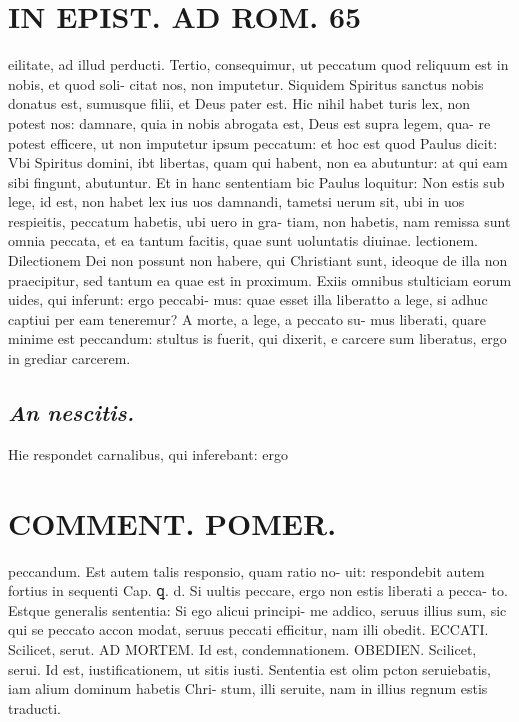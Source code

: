 \documentclass{article}
\begin{document}
\begin{pages}
\section*{IN EPIST. AD ROM.  65 }
\marginpar{[ p.]}\pstart eilitate, ad illud perducti. Tertio, consequimur, ut peccatum quod reliquum est in nobis, et quod soli- citat nos, non imputetur. Siquidem Spiritus sanctus nobis donatus est, sumusque filii, et Deus pater est.  Hic nihil habet turis lex, non potest nos: damnare, quia in nobis abrogata est, Deus est supra legem, qua- re potest efficere, ut non imputetur ipsum peccatum: et hoc est quod Paulus dicit: Vbi Spiritus domini, ibt libertas, quam qui habent, non ea abutuntur: at qui eam sibi fingunt, abutuntur. Et in hanc sententiam bic Paulus loquitur: Non estis sub lege, id est, non habet lex ius uos damnandi, tametsi uerum sit, ubi in uos respieitis, peccatum habetis, ubi uero in gra- tiam, non habetis, nam remissa sunt omnia peccata, et ea tantum facitis, quae sunt uoluntatis diuinae.  lectionem. Dilectionem Dei non possunt non habere, qui Christiant sunt, ideoque de illa non praecipitur, sed tantum ea quae est in proximum. Exiis omnibus stulticiam eorum uides, qui inferunt: ergo peccabi- mus: quae esset illa liberatto a lege, si adhuc captiui per eam teneremur? A morte, a lege, a peccato su- mus liberati, quare minime est peccandum: stultus is fuerit, qui dixerit, e carcere sum liberatus, ergo in grediar carcerem.   \pend
{}
{}
\subsection*{\textit{An nescitis. }}\pstart Hie respondet carnalibus, qui inferebant: ergo  \pend
\section*{COMMENT. POMER.  }\pstart peccandum. Est autem talis responsio, quam ratio no- uit: respondebit autem fortius in sequenti Cap. ꝗ.  d. Si uultis peccare, ergo non estis liberati a pecca- to. Estque generalis sententia: Si ego alicui principi- me addico, seruus illius sum, sic qui se peccato accon modat, seruus peccati efficitur, nam illi obedit.  ECCATI. Scilicet, serut. AD MORTEM. Id est, condemnationem.  OBEDIEN. Scilicet, serui.   \pend\pstart Id est, iustificationem, ut sitis iusti. Sententia est olim pcton seruiebatis, iam alium dominum habetis Chri- stum, illi seruite, nam in illius regnum estis traducti.   \pend
{}
{}

\end{pages}
\end{document}
